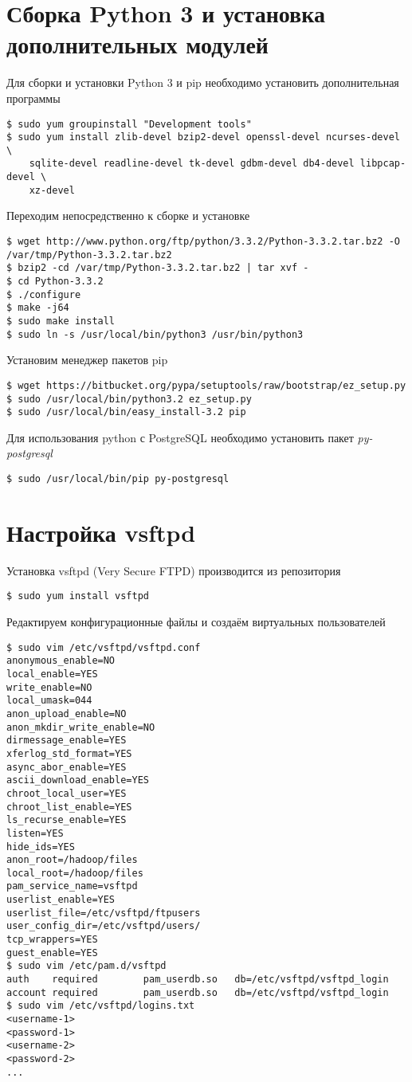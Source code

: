 \section{Сборка Python 3 и установка дополнительных модулей}
Для сборки и установки Python 3 и pip необходимо установить дополнительная программы
\begin{lstlisting}
$ sudo yum groupinstall "Development tools"
$ sudo yum install zlib-devel bzip2-devel openssl-devel ncurses-devel \
    sqlite-devel readline-devel tk-devel gdbm-devel db4-devel libpcap-devel \
    xz-devel
\end{lstlisting}
Переходим непосредственно к сборке и установке\cite{python}
\begin{lstlisting}
$ wget http://www.python.org/ftp/python/3.3.2/Python-3.3.2.tar.bz2 -O /var/tmp/Python-3.3.2.tar.bz2
$ bzip2 -cd /var/tmp/Python-3.3.2.tar.bz2 | tar xvf -
$ cd Python-3.3.2
$ ./configure
$ make -j64
$ sudo make install
$ sudo ln -s /usr/local/bin/python3 /usr/bin/python3
\end{lstlisting}

Установим менеджер пакетов pip\cite{pip}
\begin{lstlisting}
$ wget https://bitbucket.org/pypa/setuptools/raw/bootstrap/ez_setup.py
$ sudo /usr/local/bin/python3.2 ez_setup.py
$ sudo /usr/local/bin/easy_install-3.2 pip
\end{lstlisting}

Для использования python с PostgreSQL необходимо установить пакет \emph{py-postgresql}
\begin{lstlisting}
$ sudo /usr/local/bin/pip py-postgresql
\end{lstlisting}

\section{Настройка vsftpd}
Установка vsftpd (Very Secure FTPD) производится из репозитория
\begin{lstlisting}
$ sudo yum install vsftpd
\end{lstlisting}
Редактируем конфигурационные файлы и создаём виртуальных пользователей
\begin{lstlisting}
$ sudo vim /etc/vsftpd/vsftpd.conf
anonymous_enable=NO
local_enable=YES
write_enable=NO
local_umask=044
anon_upload_enable=NO
anon_mkdir_write_enable=NO
dirmessage_enable=YES
xferlog_std_format=YES
async_abor_enable=YES
ascii_download_enable=YES
chroot_local_user=YES
chroot_list_enable=YES
ls_recurse_enable=YES
listen=YES
hide_ids=YES
anon_root=/hadoop/files
local_root=/hadoop/files
pam_service_name=vsftpd
userlist_enable=YES
userlist_file=/etc/vsftpd/ftpusers
user_config_dir=/etc/vsftpd/users/
tcp_wrappers=YES
guest_enable=YES
$ sudo vim /etc/pam.d/vsftpd
auth    required        pam_userdb.so   db=/etc/vsftpd/vsftpd_login
account required        pam_userdb.so   db=/etc/vsftpd/vsftpd_login
$ sudo vim /etc/vsftpd/logins.txt
<username-1>
<password-1>
<username-2>
<password-2>
...
\end{lstlisting}

